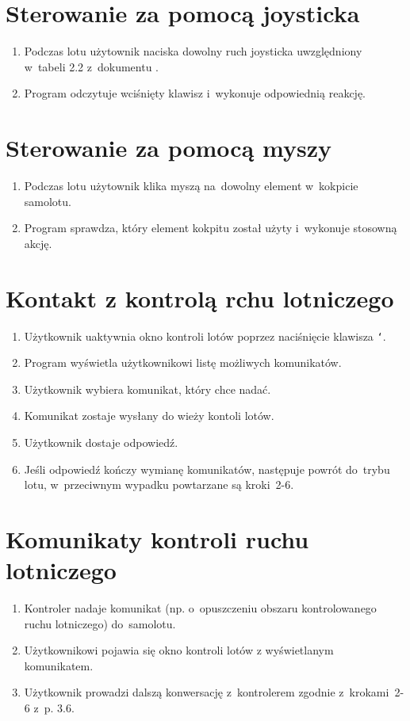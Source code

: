 \documentclass{mwrep}
\begin{document}
\section{Sterowanie za pomocą joysticka}
\begin{enumerate}
  \item Podczas lotu użytownik naciska dowolny ruch joysticka uwzględniony w~tabeli 2.2 z~dokumentu \cite{WYM}.
  \item Program odczytuje wciśnięty klawisz i~wykonuje odpowiednią reakcję.
\end{enumerate}

\section{Sterowanie za pomocą myszy}
\begin{enumerate}
  \item Podczas lotu użytownik klika myszą na~dowolny element w~kokpicie samolotu.
  \item Program sprawdza, który element kokpitu został użyty i~wykonuje stosowną akcję.
\end{enumerate}

\section{Kontakt z kontrolą rchu lotniczego}
\begin{enumerate}
  \item Użytkownik uaktywnia okno kontroli lotów poprzez naciśnięcie klawisza \texttt{`}.
  \item Program wyświetla użytkownikowi listę możliwych komunikatów.
  \item Użytkownik wybiera komunikat, który chce nadać.
  \item Komunikat zostaje wysłany do wieży kontoli lotów.
  \item Użytkownik dostaje odpowiedź.
  \item Jeśli odpowiedź kończy wymianę komunikatów, następuje powrót do~trybu lotu, w~przeciwnym wypadku powtarzane są kroki~2-6.
\end{enumerate}

\section{Komunikaty kontroli ruchu lotniczego}
\begin{enumerate}
  \item Kontroler nadaje komunikat (np. o~opuszczeniu obszaru kontrolowanego ruchu lotniczego) do~samolotu.
  \item Użytkownikowi pojawia się okno kontroli lotów z wyświetlanym komunikatem.
  \item Użytkownik prowadzi dalszą konwersację z~kontrolerem zgodnie \linebreak z~krokami~2-6 z~p. 3.6.
\end{enumerate}
\end{document}
